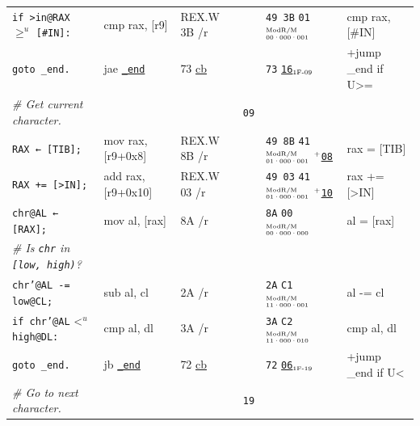 \documentclass[a4paper,12pt,final]{article}
\begin{document}
\begin{table}[!htbp]
\begin{adjustwidth}{-1cm}{-1cm}
\begin{center}
\begin{tabular}{l|ll|l|lH}
\hspace{1.053000em} \texttt{if >in@RAX} \(\ge ^{u}\) \texttt{[\#IN]:} & cmp rax, [r9] & REX.W 3B /r &  & \texttt{49 3B} \texttt{01}​\(^{\text{\tiny ModR/M}}_{\text{\tiny 00·000·001}}\) & cmp rax, [\#IN]\\[0pt]
\hspace{2.106000em}   \texttt{goto \_end.} & jae \uline{\texttt{\_end}} & 73 \uline{cb} &  & \texttt{73} \uline{\texttt{16}}​\(_{\text{\tiny 1F-09}}\) & +jump \_end if U>=\\[0pt]
\hspace{1.053000em} \emph{\# Get current character.} &  &  & \texttt{09} &  & \\[0pt]
\hspace{1.053000em} \texttt{RAX ← [TIB];} & mov rax, [r9+0x8] & REX.W 8B /r &  & \texttt{49 8B} \texttt{41}​\(^{\text{\tiny ModR/M}}_{\text{\tiny 01·000·001}}\) \(^{\text{\tiny +}}\)​\uline{\texttt{08}} & rax = [TIB]\\[0pt]
\hspace{1.053000em} \texttt{RAX += [>IN];} & add rax, [r9+0x10] & REX.W 03 /r &  & \texttt{49 03} \texttt{41}​\(^{\text{\tiny ModR/M}}_{\text{\tiny 01·000·001}}\) \(^{\text{\tiny +}}\)​\uline{\texttt{10}} & rax += [>IN]\\[0pt]
\hspace{1.053000em} \texttt{chr@AL ← [RAX];} & mov al, [rax] & 8A /r &  & \texttt{8A} \texttt{00}​\(^{\text{\tiny ModR/M}}_{\text{\tiny 00·000·000}}\) & al = [rax]\\[0pt]
\hspace{1.053000em} \emph{\# Is \texttt{chr} in \texttt{[low, high)}?} &  &  &  &  & \\[0pt]
\hspace{1.053000em} \texttt{chr'@AL -= low@CL;} & sub al, cl & 2A /r &  & \texttt{2A} \texttt{C1}​\(^{\text{\tiny ModR/M}}_{\text{\tiny 11·000·001}}\) & al -= cl\\[0pt]
\hspace{1.053000em} \texttt{if chr'@AL} \textless{}\(^{u}\) \texttt{high@DL:} & cmp al, dl & 3A /r &  & \texttt{3A} \texttt{C2}​\(^{\text{\tiny ModR/M}}_{\text{\tiny 11·000·010}}\) & cmp al, dl\\[0pt]
\hspace{2.106000em}   \texttt{goto \_end.} & jb \uline{\texttt{\_end}} & 72 \uline{cb} &  & \texttt{72} \uline{\texttt{06}}​\(_{\text{\tiny 1F-19}}\) & +jump \_end if U<\\[0pt]
\hspace{1.053000em} \emph{\# Go to next character.} &  &  & \texttt{19} &  & \\[0pt]

\end{tabular}
\end{center}
\end{adjustwidth}
\end{table}
\end{document}
